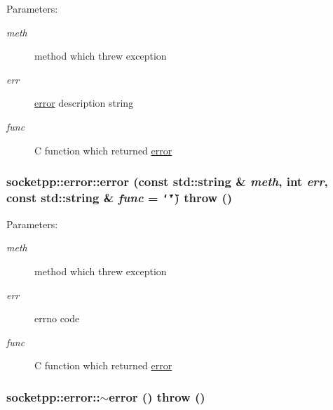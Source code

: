 \begin{Desc}
\item[Parameters:]
\begin{description}
\item[{\em meth}]method which threw exception \item[{\em err}]\hyperlink{classsocketpp_1_1error}{error} description string \item[{\em func}]C function which returned \hyperlink{classsocketpp_1_1error}{error} \end{description}
\end{Desc}
\hypertarget{classsocketpp_1_1error_1287e8ec1ff5f7b18d91ea65c2505ae8}{
\subsubsection[{error}]{\setlength{\rightskip}{0pt plus 5cm}socketpp::error::error (const std::string \& {\em meth}, \/  int {\em err}, \/  const std::string \& {\em func} = {\tt \char`\"{}\char`\"{}})  throw ()}}
\label{classsocketpp_1_1error_1287e8ec1ff5f7b18d91ea65c2505ae8}


\begin{Desc}
\item[Parameters:]
\begin{description}
\item[{\em meth}]method which threw exception \item[{\em err}]errno code \item[{\em func}]C function which returned \hyperlink{classsocketpp_1_1error}{error} \end{description}
\end{Desc}
\hypertarget{classsocketpp_1_1error_f41562a951322078eff6f56268f2f257}{
\subsubsection[{$\sim$error}]{\setlength{\rightskip}{0pt plus 5cm}socketpp::error::$\sim$error ()  throw ()}}
\label{classsocketpp_1_1error_f41562a951322078eff6f56268f2f257}





